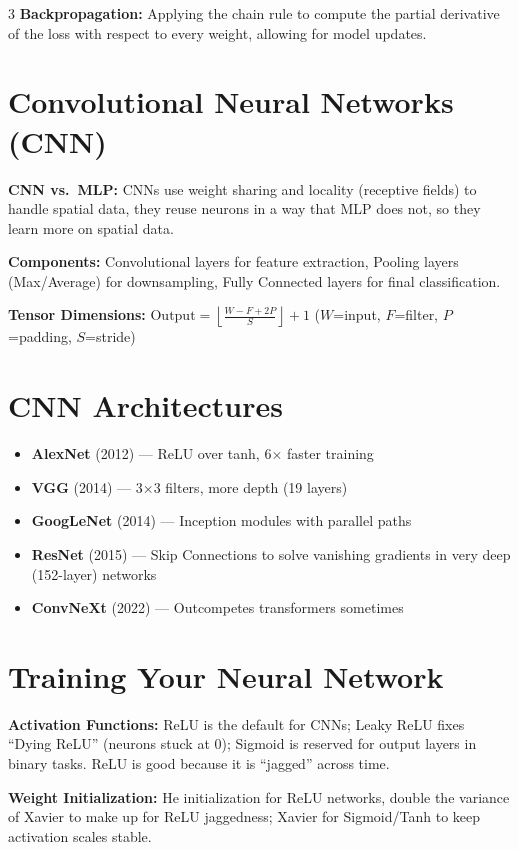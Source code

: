 \documentclass[6pt,landscape,a4paper]{extarticle}
\begin{document}
\begin{multicols}{3}
\textbf{Backpropagation:} Applying the chain rule to compute the partial derivative of the loss with respect to every weight, allowing for model updates.

\section{Convolutional Neural Networks (CNN)}

\textbf{CNN vs.\ MLP:} CNNs use weight sharing and locality (receptive fields) to handle spatial data, they reuse neurons in a way that MLP does not, so they learn more on spatial data.

\textbf{Components:} Convolutional layers for feature extraction, Pooling layers (Max/Average) for downsampling, Fully Connected layers for final classification.

\textbf{Tensor Dimensions:}
$\text{Output} = \left\lfloor \frac{W - F + 2P}{S} \right\rfloor + 1$
\quad ($W$=input, $F$=filter, $P$=padding, $S$=stride)

\section{CNN Architectures}

\begin{itemize}[nosep,leftmargin=*]
  \item \textbf{AlexNet} (2012) --- ReLU over tanh, 6$\times$ faster training
  \item \textbf{VGG} (2014) --- 3$\times$3 filters, more depth (19 layers)
  \item \textbf{GoogLeNet} (2014) --- Inception modules with parallel paths
  \item \textbf{ResNet} (2015) --- Skip Connections to solve vanishing gradients in very deep (152-layer) networks
  \item \textbf{ConvNeXt} (2022) --- Outcompetes transformers sometimes
\end{itemize}

\section{Training Your Neural Network}

\textbf{Activation Functions:} ReLU is the default for CNNs; Leaky ReLU fixes ``Dying ReLU'' (neurons stuck at 0); Sigmoid is reserved for output layers in binary tasks. ReLU is good because it is ``jagged'' across time.

\textbf{Weight Initialization:} He initialization for ReLU networks, double the variance of Xavier to make up for ReLU jaggedness; Xavier for Sigmoid/Tanh to keep activation scales stable.


\end{multicols}
\end{document}
